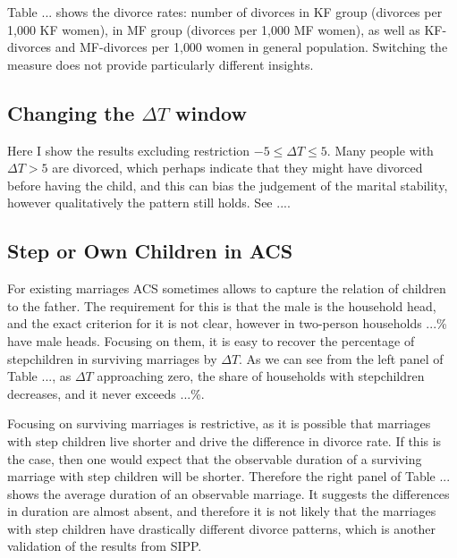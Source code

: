 \documentclass[12pt,letter]{article}
\begin{document}
Table ... shows the divorce rates: number of divorces in KF group (divorces per 1{,}000 KF women), in MF group (divorces per 1{,}000 MF women), as well as KF-divorces and MF-divorces per 1{,}000 women in general population. Switching the measure does not provide particularly different insights.

\subsection{Changing the $\Delta T$ window}
Here I show the results excluding restriction $-5\leq \Delta T \leq 5$. Many people with $\Delta T > 5$ are divorced, which perhaps indicate that they might have divorced before having the child, and this can bias the judgement of the marital stability, however qualitatively the pattern still holds. See ....

\subsection{Step or Own Children in ACS}
For existing marriages ACS sometimes allows to capture the relation of children to the father. The requirement for this is that the male is the household head, and the exact criterion for it is not clear, however in two-person households ...\% have male heads. Focusing on them, it is easy to recover the percentage of stepchildren in surviving marriages by $\Delta T$. As we can see from the left panel of Table ..., as $\Delta T$ approaching zero, the share of households with stepchildren decreases, and it never exceeds ...\%. 

Focusing on surviving marriages is restrictive, as it is possible that marriages with step children live shorter and drive the difference in divorce rate. If this is the case, then one would expect that the observable duration of a surviving marriage with step children will be shorter. Therefore the right panel of Table ... shows the average duration of an observable marriage. It suggests the differences in duration are almost absent, and therefore it is not likely that the marriages with step children have drastically different divorce patterns, which is another validation of the results from SIPP.
\end{document}
